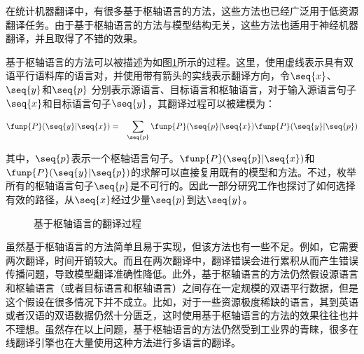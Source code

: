 \parinterval 在统计机器翻译中，有很多基于枢轴语言的方法，这些方法也已经广泛用于低资源翻译任务。由于基于枢轴语言的方法与模型结构无关，这些方法也适用于神经机器翻译，并且取得了不错的效果。

\parinterval 基于枢轴语言的方法可以被描述为如图\ref{fig:16-11}所示的过程。这里，使用虚线表示具有双语平行语料库的语言对，并使用带有箭头的实线表示翻译方向，令$\seq{x}$、$\seq{y}$和$\seq{p}$ 分别表示源语言、目标语言和枢轴语言，对于输入源语言句子$\seq{x}$和目标语言句子$\seq{y}$，其翻译过程可以被建模为：

\begin{eqnarray}
{\funp{P}(\seq{y}|\seq{x})} & = & {\sum_{\seq{p}}{\funp{P}(\seq{p}|\seq{x})\funp{P}(\seq{y}|\seq{p})}}
\label{eq:16-6}
\end{eqnarray}

\noindent 其中，$\seq{p}$表示一个枢轴语言句子。$\funp{P}(\seq{p}|\seq{x})$和$\funp{P}(\seq{y}|\seq{p})$的求解可以直接复用既有的模型和方法。不过，枚举所有的枢轴语言句子$\seq{p}$是不可行的。因此一部分研究工作也探讨了如何选择有效的路径，从$\seq{x}$经过少量$\seq{p}$到达$\seq{y}$。

\begin{figure}[h]
\centering

\caption{基于枢轴语言的翻译过程}
\label{fig:16-11}
\end{figure}

\parinterval 虽然基于枢轴语言的方法简单且易于实现，但该方法也有一些不足。例如，它需要两次翻译，时间开销较大。而且在两次翻译中，翻译错误会进行累积从而产生错误传播问题，导致模型翻译准确性降低。此外，基于枢轴语言的方法仍然假设源语言和枢轴语言（或者目标语言和枢轴语言）之间存在一定规模的双语平行数据，但是这个假设在很多情况下并不成立。比如，对于一些资源极度稀缺的语言，其到英语或者汉语的双语数据仍然十分匮乏，这时使用基于枢轴语言的方法的效果往往也并不理想。虽然存在以上问题，基于枢轴语言的方法仍然受到工业界的青睐，很多在线翻译引擎也在大量使用这种方法进行多语言的翻译。



